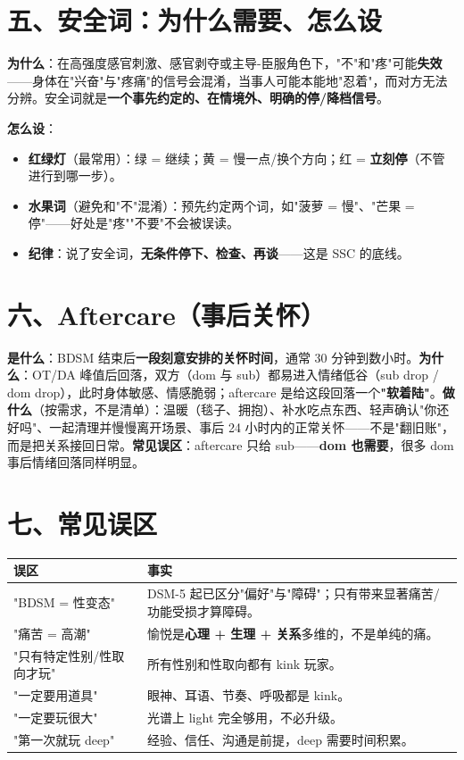 \documentclass[12pt,UTF8,openany]{ctexbook}
\begin{document}
\section{五、安全词：为什么需要、怎么设}

\textbf{为什么}：在高强度感官刺激、感官剥夺或主导-臣服角色下，"不"和"疼"可能\textbf{失效}——身体在"兴奋"与"疼痛"的信号会混淆，当事人可能本能地"忍着"，而对方无法分辨。安全词就是\textbf{一个事先约定的、在情境外、明确的停/降档信号}。

\textbf{怎么设}：
\begin{itemize}
  \item \textbf{红绿灯}（最常用）：\textcolor{mygreen}{绿} = 继续；\textcolor{myamber}{黄} = 慢一点/换个方向；\textcolor{myred}{红} = \textbf{立刻停}（不管进行到哪一步）。
  \item \textbf{水果词}（避免和"不"混淆）：预先约定两个词，如"菠萝 = 慢"、"芒果 = 停"——好处是"疼""不要"不会被误读。
  \item \textbf{纪律}：说了安全词，\textbf{无条件停下、检查、再谈}——这是 SSC 的底线。
\end{itemize}

\section{六、Aftercare（事后关怀）}

\textbf{是什么}：BDSM 结束后\textbf{一段刻意安排的关怀时间}，通常 30 分钟到数小时。\textbf{为什么}：OT/DA 峰值后回落，双方（dom 与 sub）都易进入情绪低谷（sub drop / dom drop），此时身体敏感、情感脆弱；aftercare 是给这段回落一个\textbf{"软着陆"}。\textbf{做什么}（按需求，不是清单）：温暖（毯子、拥抱）、补水吃点东西、轻声确认"你还好吗"、一起清理并慢慢离开场景、事后 24 小时内的正常关怀——不是"翻旧账"，而是把关系接回日常。\textbf{常见误区}：aftercare 只给 sub——\textbf{dom 也需要}，很多 dom 事后情绪回落同样明显。

\section{七、常见误区}

\begin{tabularx}{\textwidth}{lX}
\toprule
\textbf{误区} & \textbf{事实} \\
\midrule
"BDSM = 性变态" & DSM-5 起已区分"偏好"与"障碍"；只有带来显著痛苦/功能受损才算障碍。 \\
"痛苦 = 高潮" & 愉悦是\textbf{心理 + 生理 + 关系}多维的，不是单纯的痛。 \\
"只有特定性别/性取向才玩" & 所有性别和性取向都有 kink 玩家。 \\
"一定要用道具" & 眼神、耳语、节奏、呼吸都是 kink。 \\
"一定要玩很大" & 光谱上 light 完全够用，不必升级。 \\
"第一次就玩 deep" & 经验、信任、沟通是前提，deep 需要时间积累。 \\
\bottomrule
\end{tabularx}
\end{document}
